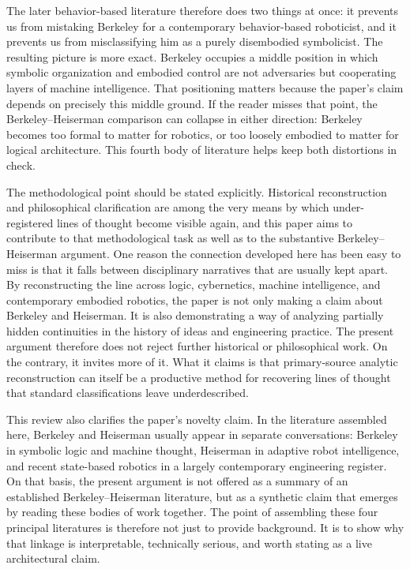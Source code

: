 \documentclass[11pt]{article}
\begin{document}
The later behavior-based literature therefore does two things at once: it prevents us from mistaking Berkeley for a contemporary behavior-based roboticist, and it prevents us from misclassifying him as a purely disembodied symbolicist. The resulting picture is more exact. Berkeley occupies a middle position in which symbolic organization and embodied control are not adversaries but cooperating layers of machine intelligence. That positioning matters because the paper's claim depends on precisely this middle ground. If the reader misses that point, the Berkeley--Heiserman comparison can collapse in either direction: Berkeley becomes too formal to matter for robotics, or too loosely embodied to matter for logical architecture. This fourth body of literature helps keep both distortions in check.

The methodological point should be stated explicitly. Historical reconstruction and philosophical clarification are among the very means by which under-registered lines of thought become visible again, and this paper aims to contribute to that methodological task as well as to the substantive Berkeley--Heiserman argument. One reason the connection developed here has been easy to miss is that it falls between disciplinary narratives that are usually kept apart. By reconstructing the line across logic, cybernetics, machine intelligence, and contemporary embodied robotics, the paper is not only making a claim about Berkeley and Heiserman. It is also demonstrating a way of analyzing partially hidden continuities in the history of ideas and engineering practice. The present argument therefore does not reject further historical or philosophical work. On the contrary, it invites more of it. What it claims is that primary-source analytic reconstruction can itself be a productive method for recovering lines of thought that standard classifications leave underdescribed.

This review also clarifies the paper's novelty claim. In the literature assembled here, Berkeley and Heiserman usually appear in separate conversations: Berkeley in symbolic logic and machine thought, Heiserman in adaptive robot intelligence, and recent state-based robotics in a largely contemporary engineering register. On that basis, the present argument is not offered as a summary of an established Berkeley--Heiserman literature, but as a synthetic claim that emerges by reading these bodies of work together. The point of assembling these four principal literatures is therefore not just to provide background. It is to show why that linkage is interpretable, technically serious, and worth stating as a live architectural claim.
\end{document}
